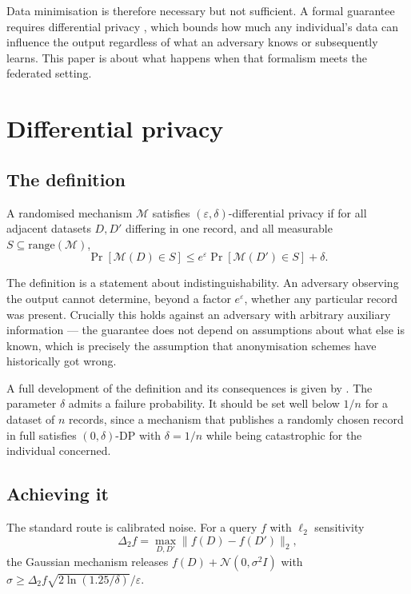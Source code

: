 \documentclass[11pt,a4paper]{article}
\begin{document}
Data minimisation is therefore necessary but not sufficient. A formal
guarantee requires differential privacy \cite{dwork2006}, which bounds how
much any individual's data can influence the output regardless of what an
adversary knows or subsequently learns. This paper is about what happens when
that formalism meets the federated setting.

\section{Differential privacy}
\label{sec:dp}

\subsection{The definition}

A randomised mechanism $\mathcal{M}$ satisfies $(\varepsilon,
\delta)$-differential privacy if for all adjacent datasets $D, D'$ differing
in one record, and all measurable $S \subseteq \mathrm{range}(\mathcal{M})$,
\begin{equation}
  \Pr[\mathcal{M}(D) \in S]
    \le e^{\varepsilon} \Pr[\mathcal{M}(D') \in S] + \delta.
  \label{eq:dp}
\end{equation}

The definition is a statement about indistinguishability. An adversary
observing the output cannot determine, beyond a factor $e^{\varepsilon}$,
whether any particular record was present. Crucially this holds against an
adversary with arbitrary auxiliary information --- the guarantee does not
depend on assumptions about what else is known, which is precisely the
assumption that anonymisation schemes have historically got wrong.

A full development of the definition and its consequences is given by
\cite{dwork2014}. The parameter $\delta$ admits a failure probability. It should be set well
below $1/n$ for a dataset of $n$ records, since a mechanism that publishes a
randomly chosen record in full satisfies $(0, \delta)$-DP with $\delta = 1/n$
while being catastrophic for the individual concerned.

\subsection{Achieving it}

The standard route is calibrated noise. For a query $f$ with $\ell_2$
sensitivity
\begin{equation}
  \Delta_2 f = \max_{D, D'} \| f(D) - f(D') \|_2,
\end{equation}
the Gaussian mechanism releases $f(D) + \mathcal{N}(0, \sigma^2 I)$ with
$\sigma \ge \Delta_2 f \sqrt{2 \ln(1.25/\delta)} / \varepsilon$.
\end{document}

